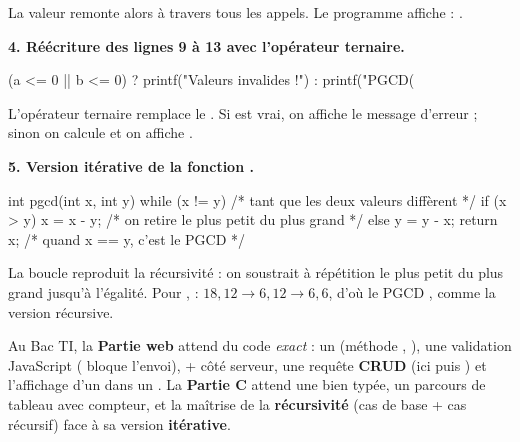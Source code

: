 \noindent La valeur  remonte alors à travers tous les appels. Le programme affiche :
.

\medskip
\textbf{4. Réécriture des lignes 9 à 13 avec l'opérateur ternaire.}

\begin{codec}
(a <= 0 || b <= 0)
    ? printf("Valeurs invalides !\n")
    : printf("PGCD(%
\end{codec}

\begin{remarque}
L'opérateur ternaire  remplace le
. Si  est vrai, on affiche le message d'erreur ;
sinon on calcule et on affiche .
\end{remarque}

\medskip
\textbf{5. Version itérative de la fonction .}

\begin{codec}
int pgcd(int x, int y) {
    while (x != y) {       /* tant que les deux valeurs diffèrent */
        if (x > y)
            x = x - y;     /* on retire le plus petit du plus grand */
        else
            y = y - x;
    }
    return x;              /* quand x == y, c'est le PGCD */
}
\end{codec}

\begin{remarque}
La boucle  reproduit la récursivité : on soustrait à répétition le plus petit du
plus grand jusqu'à l'égalité. Pour ,  : $18,12 \to 6,12 \to 6,6$,
d'où le PGCD , comme la version récursive.
\end{remarque}

\begin{aretenir}
Au Bac TI, la \textbf{Partie web} attend du code \emph{exact} : un  (méthode
, ), une validation JavaScript ( bloque l'envoi),
 +  côté serveur, une requête \textbf{CRUD}
(ici  puis ) et l'affichage d'un  dans un
. La \textbf{Partie C} attend une  bien typée, un parcours de
tableau avec compteur, et la maîtrise de la \textbf{récursivité} (cas de base + cas récursif)
face à sa version \textbf{itérative}.
\end{aretenir}
